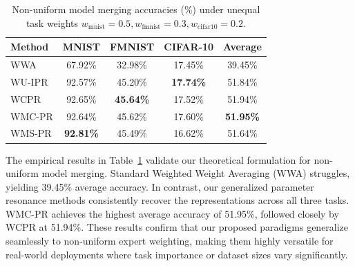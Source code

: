 \documentclass{article}
\theoremstyle{plain}
\theoremstyle{definition}
\theoremstyle{remark}
\begin{document}
\begin{table}[h]
\caption{Non-uniform model merging accuracies (\%) under unequal task weights $w_{\text{mnist}}=0.5, w_{\text{fmnist}}=0.3, w_{\text{cifar10}}=0.2$.}
\label{tab:weighted_results}
\vskip 0.1in
\begin{center}
\begin{small}
\begin{sc}
\setlength{\tabcolsep}{2.5pt}
\begin{tabular}{lcccc}
\toprule
Method & MNIST & FMNIST & CIFAR-10 & Average \\
\midrule
WWA & 67.92\% & 32.98\% & 17.45\% & 39.45\% \\
WU-IPR & 92.57\% & 45.20\% & \textbf{17.74\%} & 51.84\% \\
\midrule
WCPR & 92.65\% & \textbf{45.64\%} & 17.52\% & 51.94\% \\
WMC-PR & 92.64\% & 45.62\% & 17.60\% & \textbf{51.95\%} \\
WMS-PR & \textbf{92.81\%} & 45.49\% & 16.62\% & 51.64\% \\
\bottomrule
\end{tabular}
\end{sc}
\end{small}
\end{center}
\end{table}

The empirical results in Table~\ref{tab:weighted_results} validate our theoretical formulation for non-uniform model merging. Standard Weighted Weight Averaging (WWA) struggles, yielding 39.45\% average accuracy. In contrast, our generalized parameter resonance methods consistently recover the representations across all three tasks. WMC-PR achieves the highest average accuracy of 51.95\%, followed closely by WCPR at 51.94\%. These results confirm that our proposed paradigms generalize seamlessly to non-uniform expert weighting, making them highly versatile for real-world deployments where task importance or dataset sizes vary significantly.
\end{document}
